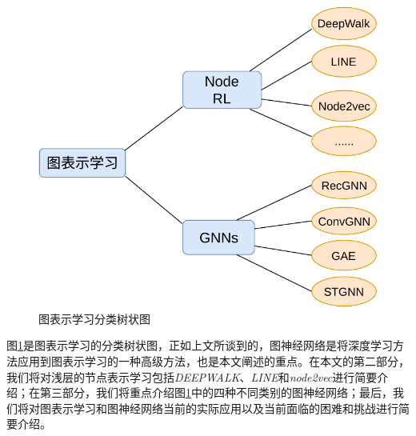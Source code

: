 \begin{figure}[!htbp]
  \centering
  \includegraphics[scale = 1]{Fig/gnn.pdf}
  \caption{图表示学习分类树状图}
  \label{fig:gnn}
\end{figure}

图\ref{fig:gnn}是图表示学习的分类树状图，正如上文所谈到的，图神经网络是将深度学习方法应用到图表示学习的一种高级方法，也是本文阐述的重点。在本文的第二部分，我们将对浅层的节点表示学习包括\emph{DEEPWALK}、\emph{LINE}和\emph{node2vec}进行简要介绍；在第三部分，我们将重点介绍图\ref{fig:gnn}中的四种不同类别的图神经网络；最后，我们将对图表示学习和图神经网络当前的实际应用以及当前面临的困难和挑战进行简要介绍。


